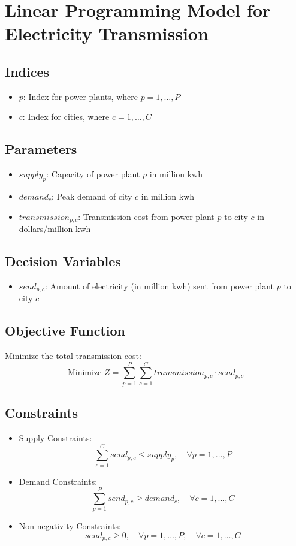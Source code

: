 \documentclass{article}
\begin{document}
\section*{Linear Programming Model for Electricity Transmission}

\subsection*{Indices}
\begin{itemize}
    \item $p$: Index for power plants, where $p = 1, \ldots, P$
    \item $c$: Index for cities, where $c = 1, \ldots, C$
\end{itemize}

\subsection*{Parameters}
\begin{itemize}
    \item $supply_p$: Capacity of power plant $p$ in million kwh
    \item $demand_c$: Peak demand of city $c$ in million kwh
    \item $transmission_{p,c}$: Transmission cost from power plant $p$ to city $c$ in dollars/million kwh
\end{itemize}

\subsection*{Decision Variables}
\begin{itemize}
    \item $send_{p,c}$: Amount of electricity (in million kwh) sent from power plant $p$ to city $c$
\end{itemize}

\subsection*{Objective Function}
Minimize the total transmission cost:
\[
\text{Minimize } Z = \sum_{p=1}^{P} \sum_{c=1}^{C} transmission_{p,c} \cdot send_{p,c}
\]

\subsection*{Constraints}

\begin{itemize}
    \item Supply Constraints:
    \[
    \sum_{c=1}^{C} send_{p,c} \leq supply_p, \quad \forall p = 1, \ldots, P
    \]
    
    \item Demand Constraints:
    \[
    \sum_{p=1}^{P} send_{p,c} \geq demand_c, \quad \forall c = 1, \ldots, C
    \]
    
    \item Non-negativity Constraints:
    \[
    send_{p,c} \geq 0, \quad \forall p = 1, \ldots, P, \quad \forall c = 1, \ldots, C
    \]
\end{itemize}
\end{document}
